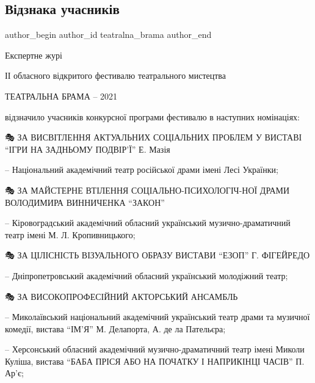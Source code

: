  
 
 
 
 

\subsection{Відзнака учасників}
\label{sec:20_09_2021.fb.teatralna_brama.1.vidznaka_uchasnykiv}

\ifcmt
 author_begin
   author_id teatralna_brama
 author_end
\fi

Експертне журі

ІІ обласного відкритого фестивалю театрального мистецтва

ТЕАТРАЛЬНА БРАМА – 2021

відзначило учасників конкурсної програми фестивалю в наступних номінаціях:

🎭  ЗА ВИСВІТЛЕННЯ АКТУАЛЬНИХ СОЦІАЛЬНИХ ПРОБЛЕМ У ВИСТАВІ \enquote{ІГРИ НА ЗАДНЬОМУ
ПОДВІР'Ї} Е. Мазія

– Національний академічний театр російської драми імені Лесі Українки;

🎭  ЗА МАЙСТЕРНЕ ВТІЛЕННЯ СОЦІАЛЬНО-ПСИХОЛОГІЧ\hyp{}НОЇ ДРАМИ ВОЛОДИМИРА ВИННИЧЕНКА
\enquote{ЗАКОН}

– Кіровоградський академічний обласний український музично-драматичний театр
імені М. Л. Кропивницького;

🎭 ЗА ЦІЛІСНІСТЬ ВІЗУАЛЬНОГО ОБРАЗУ ВИСТАВИ \enquote{ЕЗОП} Г. ФІГЕЙРЕДО

– Дніпропетровський академічний обласний український молодіжний театр;

🎭 ЗА ВИСОКОПРОФЕСІЙНИЙ АКТОРСЬКИЙ АНСАМБЛЬ 

– Миколаївський національний академічний український театр драми та музичної
комедії, вистава \enquote{ІМ'Я} М. Делапорта, А. де ла Пательєра;

– Херсонський обласний академічний музично-драматичний театр імені Миколи
Куліша, вистава \enquote{БАБА ПРІСЯ АБО НА ПОЧАТКУ І НАПРИКІНЦІ ЧАСІВ} П. Ар'є;

